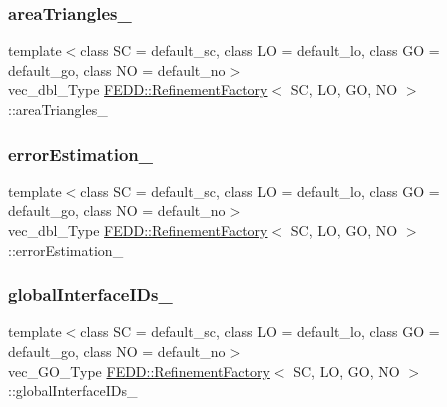 \subsubsection{\texorpdfstring{area\+Triangles\+\_\+}{areaTriangles\_}}
{\footnotesize\ttfamily template$<$class SC  = default\+\_\+sc, class LO  = default\+\_\+lo, class GO  = default\+\_\+go, class NO  = default\+\_\+no$>$ \\
vec\+\_\+dbl\+\_\+\+Type \hyperlink{classFEDD_1_1RefinementFactory}{F\+E\+D\+D\+::\+Refinement\+Factory}$<$ SC, LO, GO, NO $>$\+::area\+Triangles\+\_\+\hspace{0.3cm}{\ttfamily [protected]}}

\mbox{\label{classFEDD_1_1RefinementFactory_ae04f877455828ca9d2328b6b29a72652}} 
\subsubsection{\texorpdfstring{error\+Estimation\+\_\+}{errorEstimation\_}}
{\footnotesize\ttfamily template$<$class SC  = default\+\_\+sc, class LO  = default\+\_\+lo, class GO  = default\+\_\+go, class NO  = default\+\_\+no$>$ \\
vec\+\_\+dbl\+\_\+\+Type \hyperlink{classFEDD_1_1RefinementFactory}{F\+E\+D\+D\+::\+Refinement\+Factory}$<$ SC, LO, GO, NO $>$\+::error\+Estimation\+\_\+\hspace{0.3cm}{\ttfamily [protected]}}

\mbox{\label{classFEDD_1_1RefinementFactory_ae71ae7a6d0586a37cdc2aadfafeb00c4}} 
\subsubsection{\texorpdfstring{global\+Interface\+I\+Ds\+\_\+}{globalInterfaceIDs\_}}
{\footnotesize\ttfamily template$<$class SC  = default\+\_\+sc, class LO  = default\+\_\+lo, class GO  = default\+\_\+go, class NO  = default\+\_\+no$>$ \\
vec\+\_\+\+G\+O\+\_\+\+Type \hyperlink{classFEDD_1_1RefinementFactory}{F\+E\+D\+D\+::\+Refinement\+Factory}$<$ SC, LO, GO, NO $>$\+::global\+Interface\+I\+Ds\+\_\+\hspace{0.3cm}{\ttfamily [protected]}}

